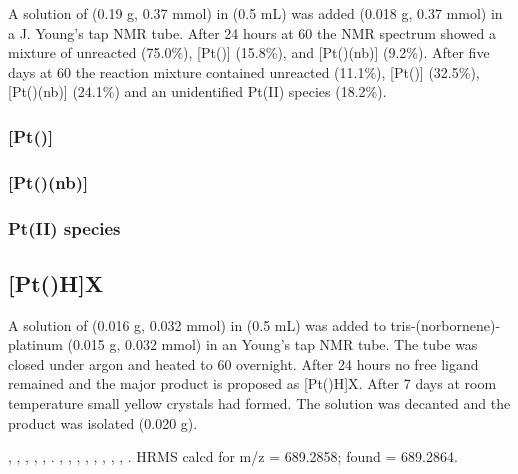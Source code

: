 A solution of \tBusixantphos{} (0.19 g, 0.37 mmol) in  (0.5 mL) was added \ce{[Pt(nb)3]} (0.018 g, 0.37 mmol) in a J. Young's tap NMR tube.  After 24 hours at 60\degC{} the \phosphorus{} NMR spectrum showed a mixture of unreacted \tBusixantphos{} (75.0\%), [Pt(\tBusixantphos)] (15.8\%), and [Pt(\tBusixantphos)(nb)] (9.2\%).  After five days at 60\degC{} the reaction mixture contained unreacted \tBusixantphos{} (11.1\%), [Pt(\tBusixantphos)] (32.5\%), [Pt(\tBusixantphos)(nb)] (24.1\%) and an unidentified Pt(II) species (18.2\%).  

\subsubsection*{[Pt(\tBusixantphos)]}


\subsubsection*{[Pt(\tBusixantphos)(nb)]}


\subsubsection*{Pt(II) \tBusixantphos{} species}


\subsection*{[Pt(\tBuxantphos)H]X}


A solution of \tBuxantphos{} (0.016 g, 0.032 mmol) in  (0.5 mL) was added to tris-(norbornene)-platinum (0.015 g, 0.032 mmol) in an Young's tap NMR tube.  The tube was closed under argon and heated to 60 \degC{} overnight.  After 24 hours no free ligand remained and the major product is proposed as [Pt(\tBuxantphosk)H]X.  After 7 days at room temperature small yellow crystals had formed.  The solution was decanted and the product was isolated (0.020 g).  

\begin{sloppypar}
,
,
,
,
,
.
,
,
,
,
,
,
,
,
.
HRMS calcd for  m/z = 689.2858; found = 689.2864.
\end{sloppypar}

